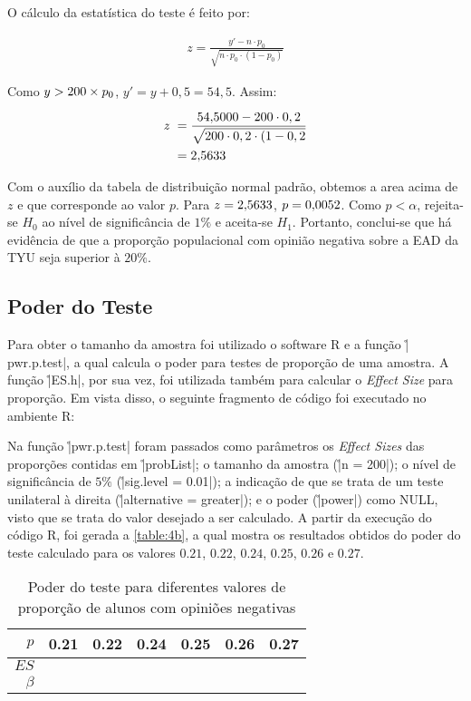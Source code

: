 	O cálculo da estatística do teste é feito por:

	\begin{align*}
		z = \frac{y' - n \cdot p_0}{\sqrt{n \cdot p_0 \cdot (1 - p_0)}}
	\end{align*}

	Como $y > 200 \times p_0$, $y' = y + 0,5 = 54,5$. Assim:

	\begin{align*}
		z &\; = \frac{\num{54.5000} - 200 \cdot 0,2}{\sqrt{200 \cdot 0,2 \cdot (1 - 0,2}}\\
		&\; = \num{2.5633}
	\end{align*}

	Com o auxílio da tabela de distribuição normal padrão, obtemos a area acima de $z$ e que corresponde 
	ao valor $p$. Para $z = \num{2.5633}$, $p = \num{0.0052}$. Como $p < \alpha$, rejeita-se $H_0$ ao nível
	de significância de $1\%$ e aceita-se $H_1$. Portanto, conclui-se que há evidência de que a proporção
	populacional com opinião negativa sobre a EAD da TYU seja superior à $20\%$.

\subsection{Poder do Teste}
\label{questao:4b}

	Para obter o tamanho da amostra foi utilizado o software R e a função \r|pwr.p.test|, a qual calcula o poder para testes de proporção de uma amostra.
	A função \r|ES.h|, por sua vez, foi utilizada também para calcular o \textit{Effect Size} para proporção.
	Em vista disso, o seguinte fragmento de código foi executado no ambiente R:


	Na função \r|pwr.p.test| foram passados como parâmetros os \textit{Effect Sizes} das proporções contidas em \r|probList|;
	o tamanho da amostra (\r|n = 200|); 
	o nível de significância de $5\%$ (\r|sig.level = 0.01|);
	a indicação de que se trata de um teste unilateral à direita (\r|alternative = greater|); 
	e o poder (\r|power|) como NULL, visto que se trata do valor desejado a ser calculado.
	A partir da execução do código R, foi gerada a \autoref{table:4b}, a qual mostra os resultados obtidos do poder do teste calculado para os valores $0.21$, $0.22$,  $0.24$, $0.25$, $0.26$ e $0.27$.

	\begin{table}[ht]
	\centering
	\caption{Poder do teste para diferentes valores de proporção de alunos com opiniões negativas} 
	\label{table:4b}
	\begin{tabular}{rrrrrrr}
		\toprule
		$p$ 	& 0.21 & 0.22 & 0.24 & 0.25 & 0.26 & 0.27 \\ 
		\midrule
		$ES$ 	& \QUATROesVinteUm & \QUATROesVinteDois & \QUATROesVinteQuatro & \QUATROesVinteCinco & \QUATROesVinteSeis & \QUATROesVinteSete \\ 
		$\beta$ & \QUATROpVinteUm & \QUATROpVinteDois & \QUATROpVinteQuatro & \QUATROpVinteCinco & \QUATROpVinteSeis & \QUATROpVinteSete \\ 
	   \bottomrule
	\end{tabular}
	\end{table}

